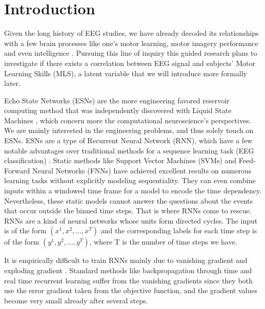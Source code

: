 \documentclass[a4paper,11pt,oneside]{article}
\begin{document}
\renewcommand{\nomname}{Abbreviations}
\printnomenclature[0.5in]
\clearpage

\section{Introduction}
Given the long history of EEG studies, we have already decoded its relationships with a few brain processes like one's motor learning, motor imagery performance and even intelligence \cite{zhang2015efficient} \cite{ozdenizci2016resting}\cite{Doppelmayr2002289}.  Pursuing this line of inquiry this guided research plans to investigate if there exists a correlation between EEG signal and subjects' Motor Learning Skills (MLS), a latent variable that we will introduce more formally later.


Echo State Networks (ESNs) \cite{jaeger2001echo} are the more engineering favored reservoir computing method that was
independently discovered with Liquid State Machines \cite{maass2002real}, which concern more the computational
neuroscience's perspectives. We are mainly interested in the engineering problems, and thus solely touch on ESNs.
ESNs are a type of Recurrent Neural Network (RNN), which have a few notable advantages over traditional methods
for a sequence learning task (EEG classification)  \cite{lipton2015critical}. Static methods like Support Vector 
Machines (SVMs) and  Feed-Forward Neural Networks (FNNs) 
   have 
achieved excellent results on numerous learning tasks without explicitly modeling sequentiality. They can even
combine inputs within a windowed time frame for a model to encode the time dependency. Nevertheless, these static models cannot answer the questions about the events that occur outside the binned time steps. That is where RNNs come to rescue.
RNNs are a kind of neural networks whose units form directed cycles. The input is of the form $(x^1, x^2, \dots, x^T)$
and the corresponding labels for each time step is of the form $(y^1, y^2, \dots, y^T)$, where T is the number of time steps we have. 

It is empirically difficult to train RNNs mainly due to vanishing gradient and exploding gradient \cite{bengio1994learning}. Standard methods like backpropagation through time
and real time recurrent learning suffer from the vanishing gradients since they both  use the error gradient
taken from the objective function, and the gradient values become very small already after several steps.
\end{document}
